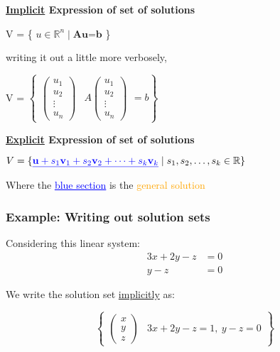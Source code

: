 \documentclass{article}
\newcommand{\bul}[1]{\textcolor{blue}{\underline{#1}}}
\newcommand{\sub}[1]{\vspace{10pt}\textbf{#1}}
\newcommand{\sbreak}{\vspace{10pt}}
\begin{document}
\sub{\underline{Implicit} Expression of set of solutions}
\begin{center}
    V = \{ $u \in \mathbb{R}^n \mid \textbf{Au=b}$ \}

    \sbreak

    writing it out a little more verbosely,

    \sbreak

    V = $\left\{\begin{array}{c|c}
        \begin{pmatrix}
            u_1 \\
            u_2 \\
            \vdots \\
            u_n
        \end{pmatrix} & A\begin{pmatrix}
            u_1 \\
            u_2 \\
            \vdots \\
            u_n
        \end{pmatrix}
    \end{array}=b\right\}$
\end{center}

\sub{\underline{Explicit} Expression of set of solutions}
\begin{center}
$V = \{\bul{\mathbf{u} + s_1 \mathbf{v}_1 + s_2 \mathbf{v}_2 + \cdots + s_k \mathbf{v}_k} \mid s_1, s_2, \dots, s_k \in \mathbb{R}\}$

\sbreak

Where the \bul{blue section} is the \textcolor{orange}{general solution}
\end{center}


\subsubsection{Example: Writing out solution sets}
\label{sec:ewoss}
Considering this linear system:
\begin{align*}
    3x + 2y - z &= 0 \\
    y - z &= 0 
\end{align*}

We write the solution set \underline{implicitly} as:

\[
\left\{
\begin{array}{c|c}
    \begin{pmatrix}
        x \\ y \\ z
    \end{pmatrix} 
    &
    3x+2y-z=1,\ y-z=0
\end{array}
\right\}
\]
\end{document}
